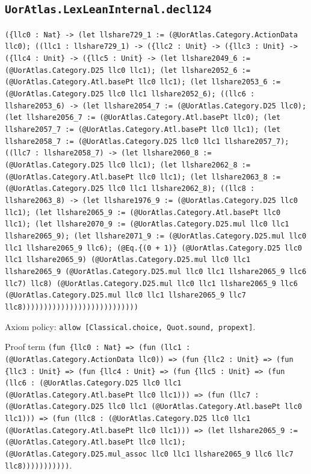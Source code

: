 \documentclass[11pt]{article}
\begin{document}
\subsection*{\texttt{UorAtlas.LexLeanInternal.decl124}}
\noindent\texttt{(\{llc0 : Nat\} -> (let llshare729\_1 := (@UorAtlas.Category.ActionData llc0); ((llc1 : llshare729\_1) -> (\{llc2 : Unit\} -> (\{llc3 : Unit\} -> (\{llc4 : Unit\} -> (\{llc5 : Unit\} -> (let llshare2049\_6 := (@UorAtlas.Category.D25 llc0 llc1); (let llshare2052\_6 := (@UorAtlas.Category.Atl.basePt llc0 llc1); (let llshare2053\_6 := (@UorAtlas.Category.D25 llc0 llc1 llshare2052\_6); ((llc6 : llshare2053\_6) -> (let llshare2054\_7 := (@UorAtlas.Category.D25 llc0); (let llshare2056\_7 := (@UorAtlas.Category.Atl.basePt llc0); (let llshare2057\_7 := (@UorAtlas.Category.Atl.basePt llc0 llc1); (let llshare2058\_7 := (@UorAtlas.Category.D25 llc0 llc1 llshare2057\_7); ((llc7 : llshare2058\_7) -> (let llshare2060\_8 := (@UorAtlas.Category.D25 llc0 llc1); (let llshare2062\_8 := (@UorAtlas.Category.Atl.basePt llc0 llc1); (let llshare2063\_8 := (@UorAtlas.Category.D25 llc0 llc1 llshare2062\_8); ((llc8 : llshare2063\_8) -> (let llshare1976\_9 := (@UorAtlas.Category.D25 llc0 llc1); (let llshare2065\_9 := (@UorAtlas.Category.Atl.basePt llc0 llc1); (let llshare2070\_9 := (@UorAtlas.Category.D25.mul llc0 llc1 llshare2065\_9); (let llshare2071\_9 := (@UorAtlas.Category.D25.mul llc0 llc1 llshare2065\_9 llc6); (@Eq.\{(0 + 1)\} (@UorAtlas.Category.D25 llc0 llc1 llshare2065\_9) (@UorAtlas.Category.D25.mul llc0 llc1 llshare2065\_9 (@UorAtlas.Category.D25.mul llc0 llc1 llshare2065\_9 llc6 llc7) llc8) (@UorAtlas.Category.D25.mul llc0 llc1 llshare2065\_9 llc6 (@UorAtlas.Category.D25.mul llc0 llc1 llshare2065\_9 llc7 llc8)))))))))))))))))))))))))))}\par
\noindent Axiom policy: \texttt{allow [Classical.choice, Quot.sound, propext]}.\par
\noindent Proof term \texttt{(fun \{llc0 : Nat\} => (fun (llc1 : (@UorAtlas.Category.ActionData llc0)) => (fun \{llc2 : Unit\} => (fun \{llc3 : Unit\} => (fun \{llc4 : Unit\} => (fun \{llc5 : Unit\} => (fun (llc6 : (@UorAtlas.Category.D25 llc0 llc1 (@UorAtlas.Category.Atl.basePt llc0 llc1))) => (fun (llc7 : (@UorAtlas.Category.D25 llc0 llc1 (@UorAtlas.Category.Atl.basePt llc0 llc1))) => (fun (llc8 : (@UorAtlas.Category.D25 llc0 llc1 (@UorAtlas.Category.Atl.basePt llc0 llc1))) => (let llshare2065\_9 := (@UorAtlas.Category.Atl.basePt llc0 llc1); (@UorAtlas.Category.D25.mul\_assoc llc0 llc1 llshare2065\_9 llc6 llc7 llc8)))))))))))}.\par
\end{document}
